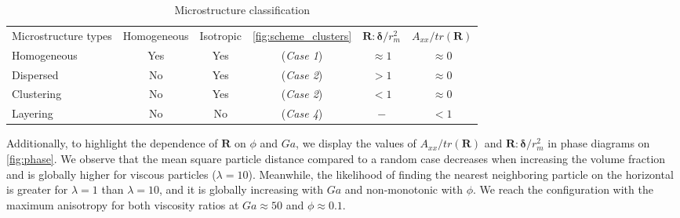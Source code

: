 \begin{table}[h!]
    \caption{Microstructure classification}
    \label{tab:microstructure}
    \centering
    \begin{tabular}{|lccccc|} \hline
        Microstructure types & Homogeneous & Isotropic & \ref{fig:scheme_clusters} & $\textbf{R}:\bm\delta/r_m^2$ & $A_{xx}/tr(\textbf{R})$ \\
        Homogeneous & Yes & Yes &(\textit{Case 1}) & $ \approx 1$ & $\approx 0$ \\
        Dispersed &  No & Yes  &(\textit{Case 2}) & $ > 1$ & $\approx 0$ \\
        Clustering &  No & Yes  &(\textit{Case 2}) & $ < 1$ & $\approx 0$ \\
        Layering &    No & No  &(\textit{Case 4}) & $ - $ & $< 1$\\ \hline
    \end{tabular}
\end{table}
Additionally, to highlight the dependence of $\textbf{R}$ on $\phi$ and $Ga$, we display the values of $A_{xx}/tr(\textbf{R})$ and $\textbf{R}:\bm\delta/r_m^2$ in phase diagrams on \ref{fig:phase}.
We observe that the mean square particle distance compared to a random case decreases when increasing the volume fraction and is globally higher for viscous particles ($\lambda = 10$).
Meanwhile, the likelihood of finding the nearest neighboring particle on the horizontal is greater for $\lambda=1$ than $\lambda = 10$, and it is globally increasing with  $Ga$ and non-monotonic with $\phi$. 
We reach the configuration with the maximum anisotropy for both viscosity ratios at $Ga \approx 50$ and $\phi \approx 0.1$. 

